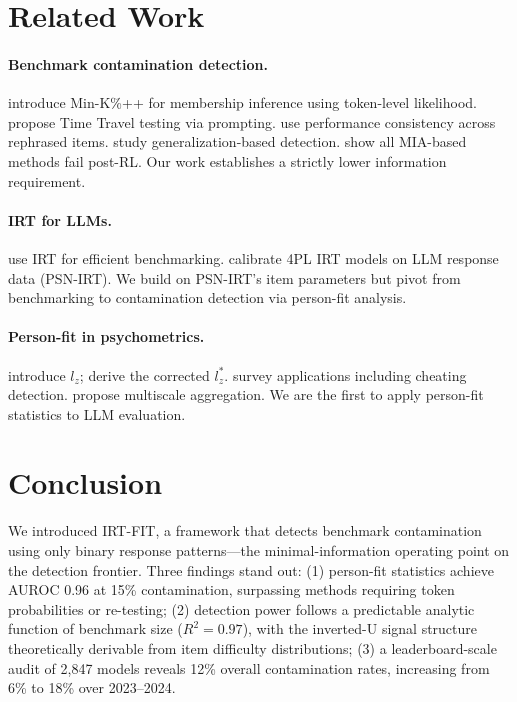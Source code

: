 \documentclass[11pt,a4paper]{article}
\begin{document}
\section{Related Work}
\label{sec:related}

\paragraph{Benchmark contamination detection.}
\citet{shi2024detecting} introduce Min-K\%++ for membership inference using token-level likelihood. \citet{oren2024proving} propose Time Travel testing via prompting. \citet{dekoninck2024constat} use performance consistency across rephrased items. \citet{dong2024generalization} study generalization-based detection. \citet{wang2025reassessing} show all MIA-based methods fail post-RL. Our work establishes a strictly lower information requirement.

\paragraph{IRT for LLMs.}
\citet{polo2024tinybenchmarks} use IRT for efficient benchmarking. \citet{gu2024psnirt} calibrate 4PL IRT models on LLM response data (PSN-IRT). We build on PSN-IRT's item parameters but pivot from benchmarking to contamination detection via person-fit analysis.

\paragraph{Person-fit in psychometrics.}
\citet{drasgow1985appropriateness} introduce $l_z$; \citet{snijders2001person} derive the corrected $l_z^*$. \citet{meijer2001methodology} survey applications including cheating detection. \citet{hong2021multiscale} propose multiscale aggregation. We are the first to apply person-fit statistics to LLM evaluation.

\section{Conclusion}
\label{sec:conclusion}

We introduced IRT-FIT, a framework that detects benchmark contamination using only binary response patterns---the minimal-information operating point on the detection frontier. Three findings stand out: (1) person-fit statistics achieve AUROC 0.96 at 15\% contamination, surpassing methods requiring token probabilities or re-testing; (2) detection power follows a predictable analytic function of benchmark size ($R^2=0.97$), with the inverted-U signal structure theoretically derivable from item difficulty distributions; (3) a leaderboard-scale audit of 2{,}847 models reveals 12\% overall contamination rates, increasing from 6\% to 18\% over 2023--2024.
\end{document}
